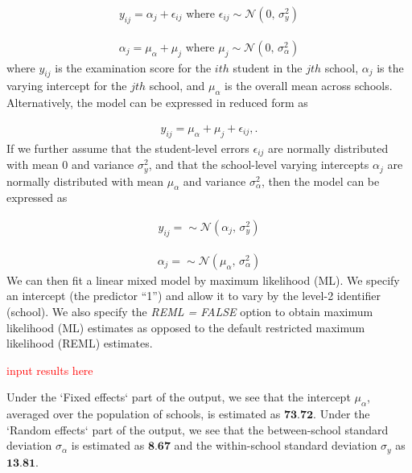 \begin{align}
	y_{ij} = \alpha_j + \epsilon_{ij} \text{ where } \epsilon_{ij} \sim \mathcal{N}(0,\,\sigma^{2}_y)
\end{align}

\begin{align}
	\alpha_j = \mu_\alpha + \mu_j \text{ where } \mu_j \sim \mathcal{N}(0,\,\sigma^{2}_\alpha)
\end{align}
where $y_{ij}$ is the examination score for the $ith$ student in the $jth$ school, $\alpha_j$ is the varying intercept for the $jth$ school, and $\mu_\alpha$ is the overall mean across schools. Alternatively, the model can be expressed in reduced form as

\begin{align}
	y_{ij} = \mu_\alpha + \mu_j + \epsilon_{ij},.
\end{align}
If we further assume that the student-level errors $\epsilon_{ij}$ are normally distributed with mean $0$ and variance $\sigma^{2}_y$, and that the school-level varying intercepts $\alpha_j$ are normally distributed with mean $\mu_\alpha$ and variance $\sigma^{2}_\alpha$, then the model can be expressed as

\begin{align}
	y_{ij} =  \sim \mathcal{N}(\alpha_j,\,\sigma^{2}_y)
\end{align}

\begin{align}
	\alpha_j =  \sim \mathcal{N}(\mu_\alpha,\,\sigma^{2}_\alpha)
\end{align}
We can then fit a linear mixed model by maximum likelihood (ML). 
We specify an intercept (the predictor “1”) and allow it to vary by the level-2 identifier (school). We also specify the \textit{REML = FALSE} option to obtain maximum likelihood (ML) estimates as opposed to the default restricted maximum likelihood (REML) estimates.

\textcolor{red}{input results here}

Under the `Fixed effects` part of the output, we see that the intercept $\mu_{\alpha}$, averaged over the population of schools, is estimated as $\textbf{73.72}$. Under the `Random effects` part of the output, we see that the between-school standard deviation $\sigma_{\alpha}$ is estimated as $\textbf{8.67}$ and the within-school standard deviation $\sigma_{y}$ as $\textbf{13.81}$. 

